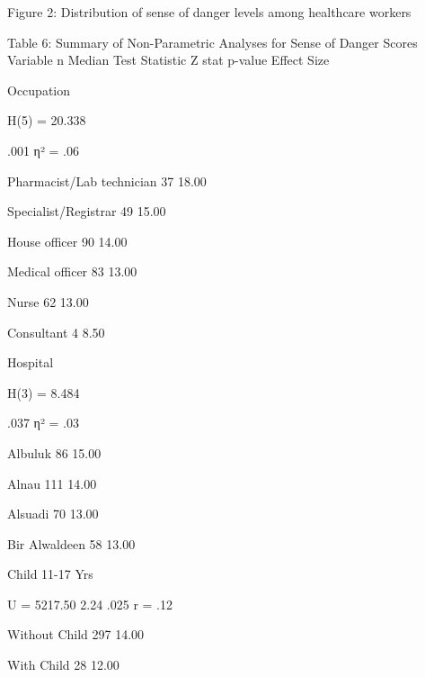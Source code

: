 Figure 2: Distribution of sense of danger levels among healthcare workers









Table 6: Summary of Non-Parametric Analyses for Sense of Danger Scores
Variable
n
Median
Test Statistic
Z stat
p-value
Effect Size

Occupation


H(5) = 20.338

.001
η² = .06

   Pharmacist/Lab technician
37
18.00





   Specialist/Registrar
49
15.00





   House officer
90
14.00





   Medical officer
83
13.00





   Nurse
62
13.00





   Consultant
4
8.50





Hospital


H(3) = 8.484

.037
η² = .03

   Albuluk
86
15.00





   Alnau
111
14.00





   Alsuadi
70
13.00





   Bir Alwaldeen
58
13.00





Child 11-17 Yrs


U = 5217.50
2.24
.025
r = .12

   Without Child
297
14.00





   With Child
28
12.00






